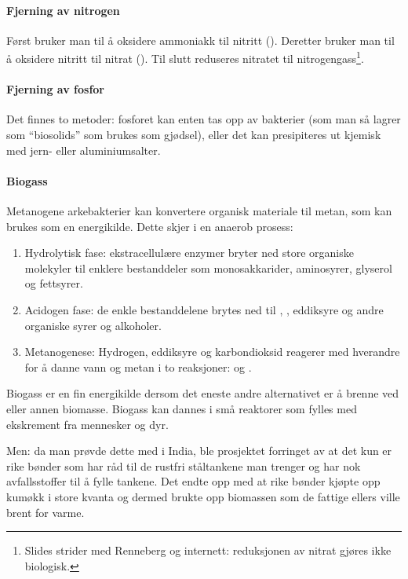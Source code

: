 \paragraph{Fjerning av nitrogen} Først bruker man  til å oksidere ammoniakk til nitritt (). Deretter bruker man  til å oksidere nitritt til nitrat (). Til slutt reduseres nitratet til nitrogengass\footnote{Slides strider med Renneberg og internett: reduksjonen av nitrat gjøres ikke biologisk.}.

\paragraph{Fjerning av fosfor} Det finnes to metoder: fosforet kan enten tas opp av bakterier (som man så lagrer som ``biosolids'' som brukes som gjødsel), eller det kan presipiteres ut kjemisk med jern- eller aluminiumsalter.

\paragraph{Biogass} Metanogene arkebakterier kan konvertere organisk materiale til metan, som kan brukes som en energikilde. Dette skjer i en anaerob prosess:
\begin{enumerate}
	\item Hydrolytisk fase: ekstracellulære enzymer bryter ned store organiske molekyler til enklere bestanddeler som monosakkarider, aminosyrer, glyserol og fettsyrer.
	\item Acidogen fase: de enkle bestanddelene brytes ned til , , eddiksyre og andre organiske syrer og alkoholer.
	\item Metanogenese: Hydrogen, eddiksyre og karbondioksid reagerer med hverandre for å danne vann og metan i to reaksjoner:  og .
\end{enumerate}
Biogass er en fin energikilde dersom det eneste andre alternativet er å brenne ved eller annen biomasse. Biogass kan dannes i små reaktorer som fylles med ekskrement fra mennesker og dyr.

Men: da man prøvde dette med  i India, ble prosjektet forringet av at det kun er rike bønder som har råd til de rustfri ståltankene man trenger og har nok avfallsstoffer til å fylle tankene. Det endte opp med at rike bønder kjøpte opp kumøkk i store kvanta og dermed brukte opp biomassen som de fattige ellers ville brent for varme.

